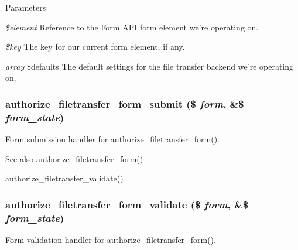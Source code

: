 \begin{DoxyParams}{Parameters}
\item[{\em \$element}]Reference to the Form API form element we're operating on. \item[{\em \$key}]The key for our current form element, if any. \item[{\em array}]\$defaults The default settings for the file transfer backend we're operating on. \end{DoxyParams}
\hypertarget{authorize_8inc_a228779582880d83c95a9bf56fae2e37c}{
\subsubsection[{authorize\_\-filetransfer\_\-form\_\-submit}]{\setlength{\rightskip}{0pt plus 5cm}authorize\_\-filetransfer\_\-form\_\-submit (\$ {\em form}, \/  \&\$ {\em form\_\-state})}}
\label{authorize_8inc_a228779582880d83c95a9bf56fae2e37c}
Form submission handler for \hyperlink{group__forms_gac54653dcbe434c2a6519e228874bba30}{authorize\_\-filetransfer\_\-form()}.

\begin{DoxySeeAlso}{See also}
\hyperlink{group__forms_gac54653dcbe434c2a6519e228874bba30}{authorize\_\-filetransfer\_\-form()} 

authorize\_\-filetransfer\_\-validate() 
\end{DoxySeeAlso}
\hypertarget{authorize_8inc_a06e85bbdcebdfe243002736d6e0e7493}{
\subsubsection[{authorize\_\-filetransfer\_\-form\_\-validate}]{\setlength{\rightskip}{0pt plus 5cm}authorize\_\-filetransfer\_\-form\_\-validate (\$ {\em form}, \/  \&\$ {\em form\_\-state})}}
\label{authorize_8inc_a06e85bbdcebdfe243002736d6e0e7493}
Form validation handler for \hyperlink{group__forms_gac54653dcbe434c2a6519e228874bba30}{authorize\_\-filetransfer\_\-form()}.


